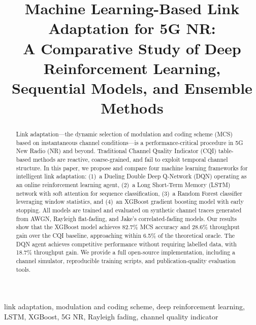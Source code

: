 \documentclass[conference]{IEEEtran}
\begin{document}
\title{Machine Learning-Based Link Adaptation for 5G NR: \\
A Comparative Study of Deep Reinforcement Learning, \\
Sequential Models, and Ensemble Methods}

\author{
}

\maketitle

\begin{abstract}
Link adaptation—the dynamic selection of modulation and coding scheme (MCS)
based on instantaneous channel conditions—is a performance-critical procedure
in 5G New Radio (NR) and beyond. Traditional Channel Quality Indicator (CQI)
table-based methods are reactive, coarse-grained, and fail to exploit temporal
channel structure. In this paper, we propose and compare four machine learning
frameworks for intelligent link adaptation: (1)~a Dueling Double Deep
Q-Network (DQN) operating as an online reinforcement learning agent,
(2)~a Long Short-Term Memory (LSTM) network with soft attention for sequence
classification, (3)~a Random Forest classifier leveraging window statistics,
and (4)~an XGBoost gradient boosting model with early stopping. All models are
trained and evaluated on synthetic channel traces generated from AWGN, Rayleigh
flat-fading, and Jake's correlated-fading models. Our results show that the
XGBoost model achieves 82.7\% MCS accuracy and 28.6\% throughput gain over the
CQI baseline, approaching within 6.5\% of the theoretical oracle. The DQN
agent achieves competitive performance without requiring labelled data, with
18.7\% throughput gain. We provide a full open-source implementation, including
a channel simulator, reproducible training scripts, and publication-quality
evaluation tools.
\end{abstract}

\begin{IEEEkeywords}
link adaptation, modulation and coding scheme, deep reinforcement learning,
LSTM, XGBoost, 5G NR, Rayleigh fading, channel quality indicator
\end{IEEEkeywords}
\end{document}
